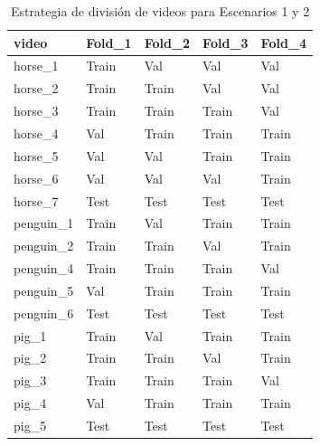 \begin{table}
\caption{Estrategia de división de videos para Escenarios 1 y 2}
\label{tab:esc1_2}
\begin{tabular}{lllll}
\toprule
video & Fold_1 & Fold_2 & Fold_3 & Fold_4 \\
\midrule
horse_1 & Train & Val & Val & Val \\
horse_2 & Train & Train & Val & Val \\
horse_3 & Train & Train & Train & Val \\
horse_4 & Val & Train & Train & Train \\
horse_5 & Val & Val & Train & Train \\
horse_6 & Val & Val & Val & Train \\
horse_7 & Test & Test & Test & Test \\
penguin_1 & Train & Val & Train & Train \\
penguin_2 & Train & Train & Val & Train \\
penguin_4 & Train & Train & Train & Val \\
penguin_5 & Val & Train & Train & Train \\
penguin_6 & Test & Test & Test & Test \\
pig_1 & Train & Val & Train & Train \\
pig_2 & Train & Train & Val & Train \\
pig_3 & Train & Train & Train & Val \\
pig_4 & Val & Train & Train & Train \\
pig_5 & Test & Test & Test & Test \\
\bottomrule
\end{tabular}
\end{table}
